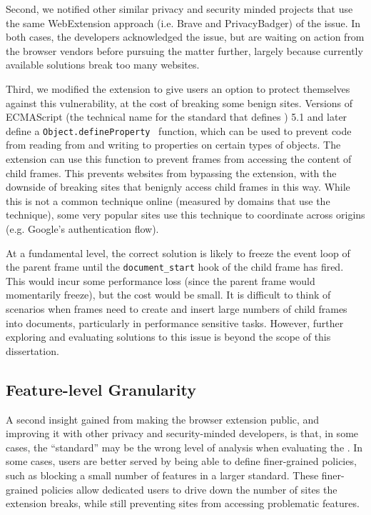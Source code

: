 Second, we notified other similar privacy and security minded
projects that use the same WebExtension approach (i.e. Brave and PrivacyBadger)
of the issue.  In both cases, the developers acknowledged the issue, but are
waiting on action from the browser vendors before pursuing the matter further,
largely because currently available solutions break too many websites.

Third, we modified the extension to give users an option to protect themselves
against this vulnerability, at the cost of breaking some benign sites.  Versions
of ECMAScript (the technical name for the standard that defines \JS) 5.1
and later define a \texttt{Object.defineProperty}~\cite{ecmascript51} function,
which can be used to prevent code from reading from and writing to properties
on certain types of objects.  The extension can use this
function to prevent frames from accessing the content of child frames.
This prevents websites from bypassing the extension, with the downside of
breaking sites that benignly access child frames in this way.  While this
is not a common technique online (measured by domains that use the technique),
some very popular sites use this technique to coordinate across origins (e.g.
Google's authentication flow).

At a fundamental level, the correct solution is likely to freeze the event loop
of the parent frame until the \texttt{document\_start}
hook of the child frame has fired.  This would incur some performance
loss (since the parent frame would momentarily freeze), but the cost would
be small.  It is difficult to think of scenarios when frames need
to create and insert large numbers of child frames into documents, particularly
in performance sensitive tasks.  However, further exploring and evaluating
solutions to this issue is beyond the scope of this dissertation.


\subsection{Feature-level Granularity}
\label{current-web:extension-deployment:feature-level}
A second insight gained from making the browser extension public, and improving
it with other privacy and security-minded developers, is that, in some cases,
the ``standard'' may be the wrong level of analysis when evaluating the
\WAPI.  In some cases, users are better served by being able to define
finer-grained policies, such as blocking a small number of features in a larger
standard.  These finer-grained policies allow dedicated users to drive down the
number of sites the extension breaks, while still preventing sites from
accessing problematic \WAPI features.

